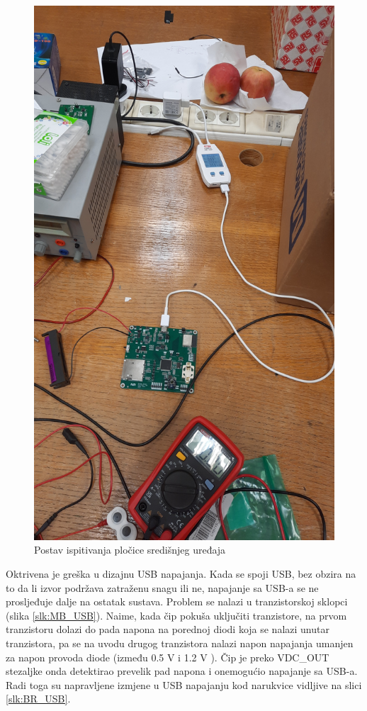 \begin{figure}[htb]
    \centering
    \includegraphics[width=10 cm]{Figures/MB_TEST_02.jpg}
    \caption{Postav ispitivanja pločice središnjeg uređaja}
    \label{slk:MB_TEST_02}
\end{figure}

Oktrivena je greška u dizajnu USB napajanja. Kada se spoji USB, bez obzira na to da li izvor podržava zatraženu snagu ili ne, napajanje sa USB-a se ne prosljeđuje dalje na ostatak sustava. Problem se nalazi u tranzistorskoj sklopci (slika \ref{slk:MB_USB}). Naime, kada čip pokuša uključiti tranzistore, na prvom tranzistoru dolazi do pada napona na porednoj diodi koja se nalazi unutar tranzistora, pa se na uvodu drugog tranzistora nalazi napon napajanja umanjen za napon provoda diode (između 0.5 V i 1.2 V \cite{di:dmp3098}). Čip je preko VDC\_OUT stezaljke onda detektirao prevelik pad napona i onemogućio napajanje sa USB-a. Radi toga su napravljene izmjene u USB napajanju kod narukvice vidljive na slici \ref{slk:BR_USB}.

